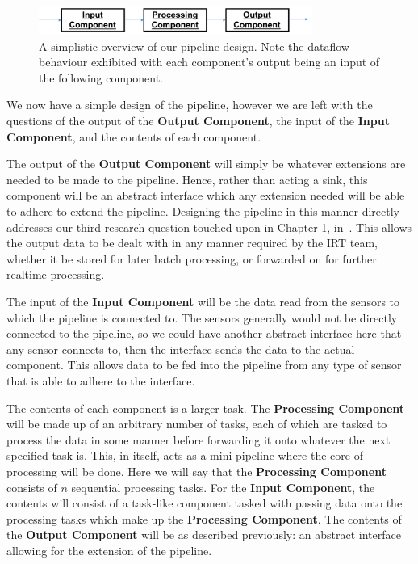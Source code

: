 \begin{figure}[ht]
  \centering
  \includegraphics[width=0.8\textwidth]{includes/figures/fig_pipeline_simple}
  \caption{A simplistic overview of our pipeline design. Note the dataflow behaviour exhibited with each component's output
  being an input of the following component.}
  \label{fig:pipeline_simple}
\end{figure}

We now have a simple design of the pipeline, however we are left with the questions of the output of the \textbf{Output Component},
the input of the \textbf{Input Component}, and the contents of each component.

The output of the \textbf{Output Component}
will simply be whatever extensions are needed to be made to the pipeline. Hence, rather than acting a sink, this component
will be an abstract interface which any extension needed will be able to adhere to extend the pipeline. Designing the pipeline
in this manner directly addresses our third research question touched upon in Chapter 1, in~.
This allows the output data to be dealt with in any manner required by the IRT team, whether it be stored for later
batch processing, or forwarded on for further realtime processing.

The input of the \textbf{Input Component} will be the data read from the sensors to which the pipeline is connected to.
The sensors generally would not be directly connected to the pipeline, so we could have another abstract interface here
that any sensor connects to, then the interface sends the data to the actual component. This allows data to be fed into
the pipeline from any type of sensor that is able to adhere to the interface.

The contents of each component is a larger task. The \textbf{Processing Component} will be made up
of an arbitrary number of tasks, each of which are tasked to process the data in some manner before forwarding it onto whatever
the next specified task is. This, in itself, acts as a mini-pipeline where the core of processing will be done. Here
we will say that the \textbf{Processing Component} consists of $n$ sequential processing tasks. For the \textbf{Input Component},
the contents will consist of a task-like component tasked with passing data onto the processing tasks which make up the
\textbf{Processing Component}. The contents of the
\textbf{Output Component} will be as described previously: an abstract interface allowing for the extension of the pipeline.


